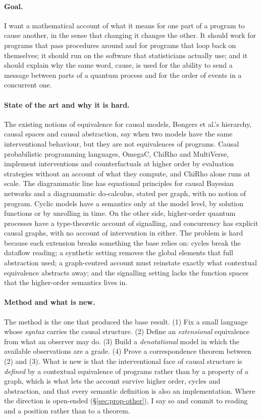 \paragraph{Goal.}
I want a mathematical account of what it means for one part of a program to cause another, in the sense that changing it changes the other. It should work for programs that pass procedures around and for programs that loop back on themselves; it should run on the software that statisticians actually use; and it should explain why the same word, cause, is used for the ability to send a message between parts of a quantum process and for the order of events in a concurrent one.

\paragraph{State of the art and why it is hard.}
The existing notions of equivalence for causal models, Bongers et al.'s hierarchy, causal spaces and causal abstraction, say when two models have the same interventional behaviour, but they are not equivalences of programs. Causal probabilistic programming languages, OmegaC, ChiRho and MultiVerse, implement interventions and counterfactuals at higher order by evaluation strategies without an account of what they compute, and ChiRho alone runs at scale. The diagrammatic line has equational principles for causal Bayesian networks and a diagrammatic do-calculus, stated per graph, with no notion of program. Cyclic models have a semantics only at the model level, by solution functions or by unrolling in time. On the other side, higher-order quantum processes have a type-theoretic account of signalling, and concurrency has explicit causal graphs, with no account of intervention in either. The problem is hard because each extension breaks something the base relies on: cycles break the dataflow reading; a synthetic setting removes the global elements that full abstraction used; a graph-centred account must reinstate exactly what contextual equivalence abstracts away; and the signalling setting lacks the function spaces that the higher-order semantics lives in.

\paragraph{Method and what is new.}
The method is the one that produced the base result. (1) Fix a small language whose \emph{syntax} carries the causal structure. (2) Define an \emph{extensional} equivalence from what an observer may do. (3) Build a \emph{denotational} model in which the available observations are a grade. (4) Prove a correspondence theorem between (2) and (3). What is new is that the interventional face of causal structure is \emph{defined} by a contextual equivalence of programs rather than by a property of a graph, which is what lets the account survive higher order, cycles and abstraction, and that every semantic definition is also an implementation. Where the direction is open-ended (\S\ref{sec:prop-other}), I say so and commit to reading and a position rather than to a theorem.

